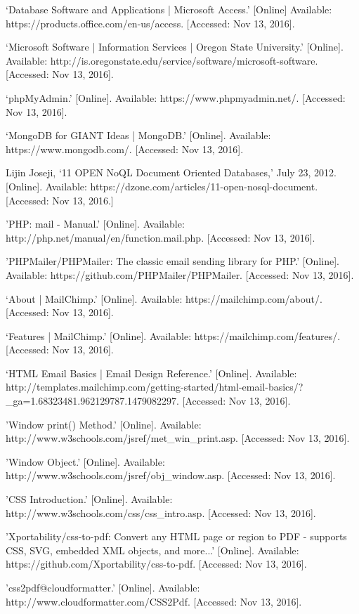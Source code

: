 \documentclass{IEEEtran}
\begin{document}
\begin{thebibliography}{99} %

`Database Software and Applications | Microsoft Access.' [Online] Available: https://products.office.com/en-us/access. [Accessed: Nov 13, 2016].

`Microsoft Software | Information Services | Oregon State University.' [Online]. Available: http://is.oregonstate.edu/service/software/microsoft-software. [Accessed: Nov 13, 2016].

`phpMyAdmin.' [Online]. Available: https://www.phpmyadmin.net/. [Accessed: Nov 13, 2016].

`MongoDB for GIANT Ideas | MongoDB.' [Online]. Available: https://www.mongodb.com/. [Accessed: Nov 13, 2016].

Lijin Joseji, `11 OPEN NoQL Document Oriented Databases,' July 23, 2012. [Online]. Available: https://dzone.com/articles/11-open-nosql-document. [Accessed: Nov 13, 2016.]

'PHP: mail - Manual.' [Online]. Available: http://php.net/manual/en/function.mail.php. [Accessed: Nov 13, 2016].

'PHPMailer/PHPMailer: The classic email sending library for PHP.' [Online]. Available: https://github.com/PHPMailer/PHPMailer. [Accessed: Nov 13, 2016].

`About | MailChimp.' [Online]. Available: https://mailchimp.com/about/. [Accessed: Nov 13, 2016]. 

`Features | MailChimp.' [Online]. Available: https://mailchimp.com/features/. [Accessed: Nov 13, 2016].

`HTML Email Basics | Email Design Reference.' [Online]. Available: http://templates.mailchimp.com/getting-started/html-email-basics/?\_ga=1.68323481.962129787.1479082297. [Accessed: Nov 13, 2016].

'Window print() Method.' [Online]. Available: http://www.w3schools.com/jsref/met\_win\_print.asp. [Accessed: Nov 13, 2016].

'Window Object.'  [Online]. Available: http://www.w3schools.com/jsref/obj\_window.asp. [Accessed: Nov 13, 2016].

'CSS Introduction.' [Online]. Available: http://www.w3schools.com/css/css\_intro.asp. [Accessed: Nov 13, 2016].

'Xportability/css-to-pdf: Convert any HTML page or region to PDF - supports CSS, SVG, embedded XML objects, and more...' [Online]. Available: https://github.com/Xportability/css-to-pdf. [Accessed: Nov 13, 2016].

'css2pdf@cloudformatter.' [Online]. Available: http://www.cloudformatter.com/CSS2Pdf. [Accessed: Nov 13, 2016].

\end{thebibliography}
\end{document}
